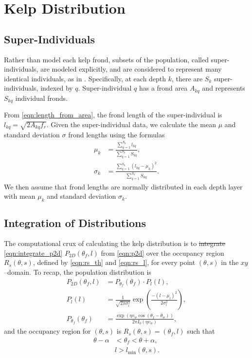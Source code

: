 \documentclass[ms,cpyr,lof,lot]{uathesis}
\newcommand{\ds}{\displaystyle}
\providecommand{\DIFadd}[1]{{\protect\color{blue}\uwave{#1}}} %
\providecommand{\DIFdel}[1]{{\protect\color{red}\sout{#1}}}                      %
\providecommand{\DIFaddbegin}{} %
\providecommand{\DIFaddend}{} %
\providecommand{\DIFdelbegin}{} %
\providecommand{\DIFdelend}{} %
\newcommand{\DIFscaledelfig}{0.5}
\newlength{\DIFdelgraphicswidth} %
\newlength{\DIFdelgraphicsheight} %
\newcommand{\DIFaddincludegraphics}[2][]{{\color{blue}\fbox{\DIFOincludegraphics[#1]{#2}}}} %
\newcommand{\DIFdelincludegraphics}[2][]{%
\sbox{\DIFdelgraphicsbox}{\DIFOincludegraphics[#1]{#2}}%
\settoboxwidth{\DIFdelgraphicswidth}{\DIFdelgraphicsbox} %
\settoboxtotalheight{\DIFdelgraphicsheight}{\DIFdelgraphicsbox} %
\scalebox{\DIFscaledelfig}{%
\parbox[b]{\DIFdelgraphicswidth}{\usebox{\DIFdelgraphicsbox}\\[-\baselineskip] \rule{\DIFdelgraphicswidth}{0em}}\llap{\resizebox{\DIFdelgraphicswidth}{\DIFdelgraphicsheight}{%
\setlength{\unitlength}{\DIFdelgraphicswidth}%
\begin{picture}(1,1)%
\thicklines\linethickness{2pt} %
{\color[rgb]{1,0,0}\put(0,0){\framebox(1,1){}}}%
{\color[rgb]{1,0,0}\put(0,0){\line( 1,1){1}}}%
{\color[rgb]{1,0,0}\put(0,1){\line(1,-1){1}}}%
\end{picture}%
}\hspace*{3pt}}} %
} %
\DeclareRobustCommand{\DIFaddbegin}{\DIFOaddbegin \let\includegraphics\DIFaddincludegraphics} %
\DeclareRobustCommand{\DIFaddend}{\DIFOaddend \let\includegraphics\DIFOincludegraphics} %
\DeclareRobustCommand{\DIFdelbegin}{\DIFOdelbegin \let\includegraphics\DIFdelincludegraphics} %
\DeclareRobustCommand{\DIFdelend}{\DIFOaddend \let\includegraphics\DIFOincludegraphics} %
\begin{document}
\section{Kelp Distribution}

\subsection{Super-Individuals}
\label{sec:si}

Rather than model each kelp frond, subsets of the population, called super-individuals, are modeled explicitly, and are considered to represent many identical individuals, as in \citep{scheffer_super-individuals_1994}.
Specifically, at each depth $k$, there are $S_k$ super-individuals, indexed by $q$.
Super-individual $q$ has a frond area $A_{kq}$ and represents $S_{kq}$ individual fronds.

From \DIFdelbegin %
\DIFdelend \DIFaddbegin \eqref{eqn:length_from_area}\DIFaddend , the frond length of the super-individual is $l_{kq} = \sqrt{2A_{kq}f_r}$.
Given the super-individual data, we calculate the mean $\mu$ and standard deviation $\sigma$ frond
lengths using the formulas
\begin{align}
  \mu_k &= \frac{\ds \sum_{q=1}^{S_k} l_{kq}}{\ds \sum_{q=1}^{S_k} S_{kq}},
  \label{eqn:si_mean} \\
  \sigma_k &= \frac{\ds \sum_{q=1}^{S_k} \left( l_{kq} - \mu_k \right)^2}{\ds \sum_{q=1}^{S_k} S_{kq}}.
  \label{eqn:si_std}
\end{align}
We then assume that frond lengths are normally distributed in each depth layer
with mean $\mu_k$ and standard deviation $\sigma_k$.

\subsection{Integration of Distributions}
The computational crux of calculating the kelp distribution is to \DIFdelbegin \DIFdel{integrate }\DIFdelend \DIFaddbegin \DIFadd{evaluate }\eqref{eqn:integrate_p2d} \DIFadd{by integrating }\DIFaddend $P_{2D}(\theta_f, l)$ from \eqref{eqn:p2d} over the occupancy region $R_s(\theta, s)$, defined by \eqref{eqn:rs_th} and \eqref{eqn:rs_l}, for every point $(\theta,s)$ in the $xy$--domain.
To recap, the population distribution is
\begin{align*}
	P_{2D}(\theta_f,l) &= P_{\theta_f}(\theta_f) \cdot P_l(l), \\
  P_l(l) &= \frac{1}{\sqrt{2\pi\sigma_l^2}}\exp\left(\frac{-(l-\mu_l)^2}{2\sigma_l^2}\right), \\
	P_{\theta_f}(\theta_f) &= \frac{\exp\left(\eta v_w\cos(\theta_f-\theta_w)\right)}{2\pi I_0(\eta v_w)},
\end{align*}
and the occupancy region for $(\theta, s)$ is $R_s(\theta, s) = (\theta_f, l)$ such that
\begin{align*}
	\theta - \alpha &< \theta_f < \theta + \alpha, \\
	&l > l_{\min}(\theta,s).
\end{align*}
\end{document}
